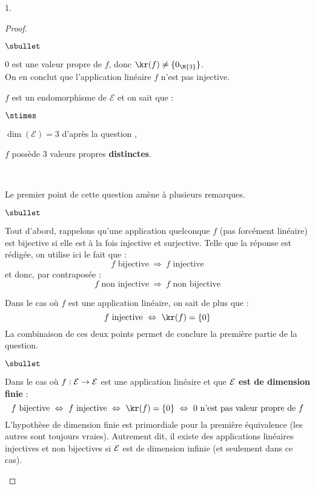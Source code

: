 \documentclass[11pt]{article}%
\begin{document}
\begin{noliste}{1.}
\begin{proof}~
 \begin{noliste}{$\sbullet$}
  \item $0$ est une valeur propre de $f$, donc $\kr(f) \neq
      \{0_{\M{3}}\}$.\\
      On en conclut que l'application linéaire $f$ n'est pas
      injective.
  \item $f$ est un endomorphisme de $\mathcal{E}$ et on sait que :
  \begin{noliste}{$\stimes$}
  \item $\dim(\mathcal{E})=3$ d'après la question ,
  \item $f$ possède $3$ valeurs propres {\bf distinctes}.
  \end{noliste}
  ~\\[-1.2cm]
 \end{noliste}
 
 \begin{remark}%
      Le premier point de cette question amène à plusieurs remarques.
      \begin{noliste}{$\sbullet$}
      \item Tout d'abord, rappelons qu'une application quelconque $f$ 
(pas
        forcément linéaire) est bijective si elle est à la fois
        injective et surjective. Telle que la réponse est rédigée, on
        utilise ici le fait que : 
        \[
        \text{$f$ bijective} \ \Rightarrow \ \text{$f$ injective}
        \]
        et donc, par contraposée : 
        \[
        \text{$f$ non injective} \ \Rightarrow \ \text{$f$ non
          bijective}
        \]
        
      \item Dans le cas où $f$ est une application linéaire, on sait
        de plus que : 
        \[
        \text{$f$ injective} \ \Leftrightarrow \ \kr(f) = \{0\}
        \]
        La combinaison de ces deux points permet de conclure la
        première partie de la question.
    \end{noliste}
 \end{remark}
 
 
 \newpage
        
        
 \begin{remark}
   \begin{noliste}{$\sbullet$}
      \item Dans le cas où $f : {\cal E} \to {\cal E}$ est une
        application linéaire et que {\bf ${\cal E}$ est de dimension
          finie} :
        \[
        \text{$f$ bijective} \ \Leftrightarrow \ \text{$f$ injective}
        \ \Leftrightarrow \ \kr(f) = \{0\} \ \Leftrightarrow \
        \text{$0$ n'est pas valeur propre de $f$}
        \]
        L'hypothèse de dimension finie est primordiale pour la
        première équivalence (les autres sont toujours vraies).
        Autrement dit, il existe des applications linéaires injectives
        et non bijectives si ${\cal E}$ est de dimension infinie (et
        seulement dans ce cas).


\end{noliste}
\end{remark}
\end{proof}
\end{noliste}
\end{document}
